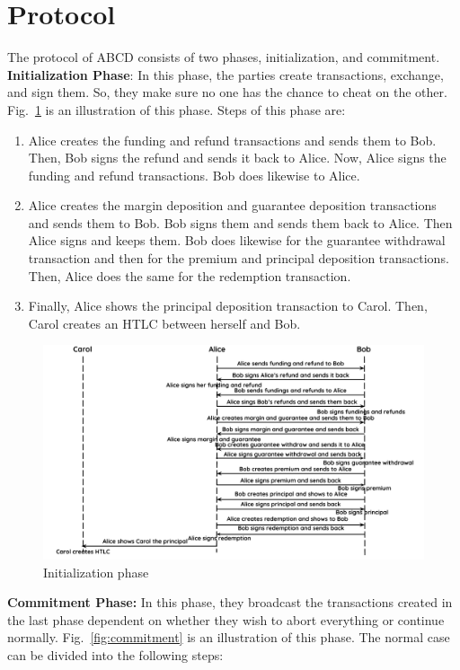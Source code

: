 \documentclass{article}
\begin{document}
\section{Protocol}
The protocol of ABCD consists of two phases, initialization, and commitment.\\
\textbf{Initialization Phase}:
In this phase, the parties create transactions, exchange, and sign them. So, they make sure no one has the chance to cheat on the other. Fig.~\ref{fig:initialization} is an illustration of this phase. Steps of this phase are:
\begin{enumerate}
    \item Alice creates the funding and refund transactions and sends them to Bob. Then, Bob signs the refund and sends it back to Alice. Now, Alice signs the funding and refund transactions. Bob does likewise to Alice. 
    \item Alice creates the margin deposition and guarantee deposition transactions and sends them to Bob. Bob signs them and sends them back to Alice. Then Alice signs and keeps them. Bob does likewise for the guarantee withdrawal transaction and then for the premium and principal deposition transactions. Then, Alice does the same for the redemption transaction.
    \item Finally, Alice shows the principal deposition transaction to Carol. Then, Carol creates an HTLC between herself and Bob.
\end{enumerate}
\begin{figure}
    \centering
    \includegraphics[width=\textwidth]{ABCDinitialization.pdf}
    \caption{Initialization phase}
    \label{fig:initialization}
\end{figure}
\textbf{Commitment Phase:}
In this phase, they broadcast the transactions created in the last phase dependent on whether they wish to abort everything or continue normally. Fig.~\ref{fig:commitment} is an illustration of this phase. The normal case can be divided into the following steps:
\end{document}
